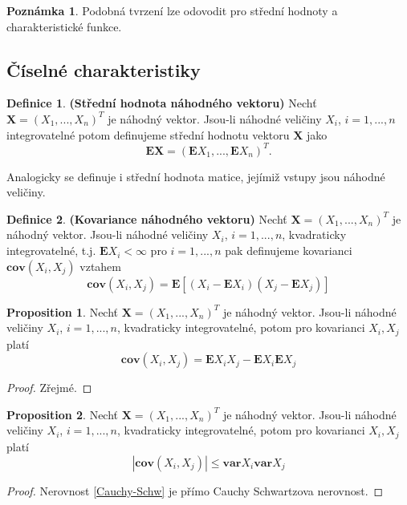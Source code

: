 \documentclass[a4]{report}
\theoremstyle{definition}
\newtheorem{definition}{Definice}[section]
\newtheorem{remark}{Poznámka}[section]
\newtheorem{proposition}{Proposition}[section]
\begin{document}
{\begin{remark}
Podobná tvrzení lze odovodit pro střední hodnoty a charakteristické funkce.
\end{remark}

\subsection{Číselné charakteristiky}
\begin{definition}{\textbf{(Střední hodnota náhodného vektoru)}}
Nechť $\textbf{X} = (X_{1}, ..., X_{n})^{T}$ je náhodný vektor. Jsou-li náhodné veličiny $X_{i}$, $i = 1, ..., n$ integrovatelné potom definujeme střední hodnotu vektoru $\textbf{X}$ jako
\begin{equation}
\mathbf{E}\textbf{X} = (\mathbf{E}X_{1}, ..., \mathbf{E}X_{n})^{T}.
\end{equation}
\end{definition}

Analogicky se definuje i střední hodnota matice, jejímiž vstupy jsou náhodné veličiny.

\begin{definition}{\textbf{(Kovariance náhodného vektoru)}}
Nechť $\textbf{X} = (X_{1}, ..., X_{n})^{T}$ je náhodný vektor. Jsou-li náhodné veličiny $X_{i}$, $i = 1, ..., n$, kvadraticky integrovatelné, t.j. $\mathbf{E}X_{i} < \infty$ pro $i = 1, ..., n$ pak definujeme kovarianci $\mathbf{cov}(X_{i}, X_{j})$ vztahem
\begin{equation}
\mathbf{cov}(X_{i}, X_{j}) = \mathbf{E}[(X_{i} - \mathbf{E}X_{i})(X_{j} - \mathbf{E}X_{j})] 
\end{equation}
\end{definition}

\begin{proposition}
Nechť $\textbf{X} = (X_{1}, ..., X_{n})^{T}$ je náhodný vektor. Jsou-li náhodné veličiny $X_{i}$, $i = 1, ..., n$, kvadraticky integrovatelné, potom pro kovarianci $X_{i}, X_{j}$ platí
\begin{equation}
\mathbf{cov}(X_{i}, X_{j}) = \mathbf{E}X_{i}X_{j} - \mathbf{E}X_{i}\mathbf{E}X_{j}
\end{equation}
\end{proposition}
\begin{proof}
Zřejmé.
\end{proof}

\begin{proposition}\label{Cauchy-SchwProp}
Nechť $\textbf{X} = (X_{1}, ..., X_{n})^{T}$ je náhodný vektor. Jsou-li náhodné veličiny $X_{i}$, $i = 1, ..., n$, kvadraticky integrovatelné, potom pro kovarianci $X_{i}, X_{j}$ platí
\begin{equation}\label{Cauchy-Schw}
|\mathbf{cov}(X_{i}, X_{j})| \leq \mathbf{var}X_{i} \mathbf{var}X_{j}
\end{equation}
\end{proposition}
\begin{proof}
Nerovnost \eqref{Cauchy-Schw} je přímo Cauchy Schwartzova nerovnost.
\end{proof}

}
\end{document}
